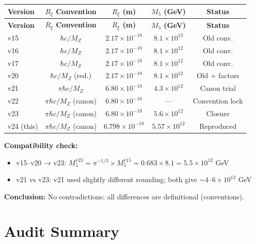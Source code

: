 \documentclass[11pt,a4paper]{article}
\newcommand{\Rxi}{R_\xi}
\newcommand{\Mfive}{M_5}
\newcommand{\MZ}{M_Z}
\newcommand{\hbarc}{\hbar c}
\begin{document}
\begin{center}
\begin{longtable}{lcccc}
\toprule
\textbf{Version} & \textbf{$\Rxi$ Convention} & \textbf{$\Rxi$ (m)} & \textbf{$\Mfive$ (GeV)} & \textbf{Status} \\
\midrule
\endfirsthead
\toprule
\textbf{Version} & \textbf{$\Rxi$ Convention} & \textbf{$\Rxi$ (m)} & \textbf{$\Mfive$ (GeV)} & \textbf{Status} \\
\midrule
\endhead
v15 & $\hbarc/\MZ$ & $2.17 \times 10^{-18}$ & $8.1 \times 10^{12}$ & Old conv. \\
v16 & $\hbarc/\MZ$ & $2.17 \times 10^{-18}$ & $8.1 \times 10^{12}$ & Old conv. \\
v17 & $\hbarc/\MZ$ & $2.17 \times 10^{-18}$ & $8.1 \times 10^{12}$ & Old conv. \\
v20 & $\hbarc/\MZ$ (red.) & $2.17 \times 10^{-18}$ & $8.1 \times 10^{12}$ & Old + factors \\
\midrule
v21 & $\pi\hbarc/\MZ$ & $6.80 \times 10^{-18}$ & $4.3 \times 10^{12}$ & Canon trial \\
v22 & $\pi\hbarc/\MZ$ (canon) & $6.80 \times 10^{-18}$ & --- & Convention lock \\
v23 & $\pi\hbarc/\MZ$ (canon) & $6.80 \times 10^{-18}$ & $5.6 \times 10^{12}$ & Closure \\
\midrule
v24 (this) & $\pi\hbarc/\MZ$ (canon) & $6.798 \times 10^{-18}$ & $5.57 \times 10^{12}$ & Reproduced \\
\bottomrule
\end{longtable}
\end{center}

\textbf{Compatibility check:}
\begin{itemize}
\item v15--v20 → v23: $\Mfive^{\mathrm{v23}} = \pi^{-1/3} \times \Mfive^{\mathrm{v15}}
= 0.683 \times 8.1 = 5.5 \times 10^{12}$ GeV \checkmark
\item v21 vs v23: v21 used slightly different rounding; both give $\sim 4$--$6 \times 10^{12}$ GeV
\end{itemize}

\textbf{Conclusion:} No contradictions; all differences are definitional (conventions).

\section{Audit Summary}
\end{document}
